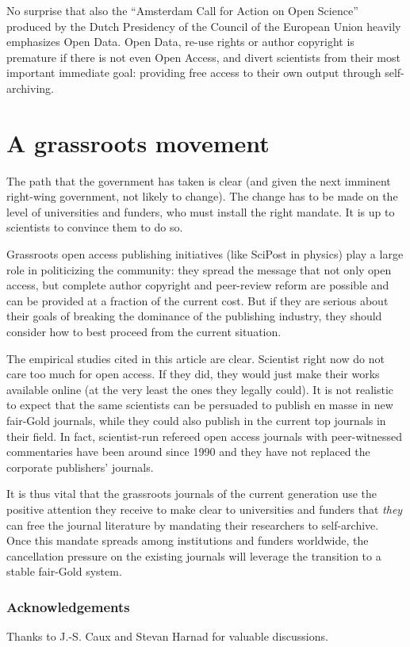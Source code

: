 \documentclass[11pt, openany, oneside, article, a4paper, twocolumn]{memoir}
\begin{document}
No surprise that also the \enquote{Amsterdam Call for Action on Open Science}
\cite{amsterdam_call} produced by the Dutch Presidency of the Council of the
European Union heavily emphasizes Open Data. Open Data, re-use rights or author
copyright is premature if there is not even Open Access, and divert scientists
from their most important immediate goal: providing free access to their own
output through self-archiving.

\section{A grassroots movement}

The path that the government has taken is clear (and given the next
imminent right-wing government, not likely to change). The change has to
be made on the level of universities and funders, who must install the
right mandate. It is up to scientists to convince them to do so.

Grassroots open access publishing initiatives (like SciPost \cite{scipost}
in physics) play a large role in politicizing the community: they spread
the message that not only open access, but complete author copyright and
peer-review reform are possible and can be provided at a fraction of the
current cost. But if they are serious about their goals of breaking the
dominance of the publishing industry, they should consider how to best
proceed from the current situation. 

The empirical studies cited in this article are clear. Scientist right now
do not care too much for open access. If they did, they would just make
their works available online (at the very least the ones they legally
could). It is not realistic to expect that the same scientists can be
persuaded to publish en masse in new fair-Gold journals, while they could
also publish in the current top journals in their field. In fact,
scientist-run refereed open access journals with peer-witnessed
commentaries have been around since 1990 \cite{psycoloquy} and they have
not replaced the corporate publishers' journals.

It is thus vital that the grassroots journals of the current generation
use the positive attention they receive to make clear to universities and
funders that \emph{they} can free the journal literature by mandating
their researchers to self-archive. Once this mandate spreads among
institutions and funders worldwide, the cancellation pressure on the
existing journals will leverage the transition to a stable fair-Gold
system.

\subsubsection{Acknowledgements} Thanks to J.-S. Caux and Stevan Harnad
for valuable discussions.

\printbibliography
\end{document}
